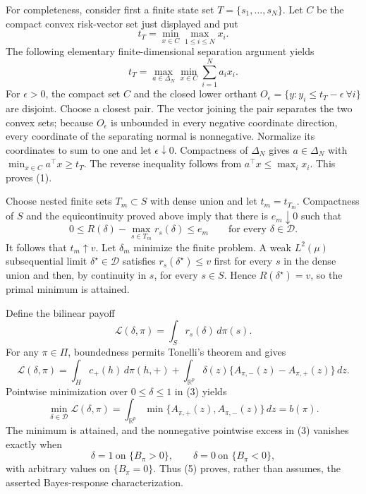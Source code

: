 For completeness, consider first a finite state set \(T=\{s_1,\ldots,s_N\}\). Let \(C\) be the compact convex risk-vector set just displayed and put
\[
 t_T=\min_{x\in C}\max_{1\leq i\leq N}x_i.
\]
The following elementary finite-dimensional separation argument yields
\[
 t_T=\max_{a\in\Delta_N}\min_{x\in C}\sum_{i=1}^Na_ix_i. \tag{1}
\]
For \(\epsilon>0\), the compact set \(C\) and the closed lower orthant \(O_{\epsilon}=\{y:y_i\leq t_T-\epsilon\ \forall i\}\) are disjoint. Choose a closest pair. The vector joining the pair separates the two convex sets; because \(O_{\epsilon}\) is unbounded in every negative coordinate direction, every coordinate of the separating normal is nonnegative. Normalize its coordinates to sum to one and let \(\epsilon\downarrow0\). Compactness of \(\Delta_N\) gives \(a\in\Delta_N\) with \(\min_{x\in C}a^{\top}x\geq t_T\). The reverse inequality follows from \(a^{\top}x\leq\max_i x_i\). This proves (1).

Choose nested finite sets \(T_m\subset S\) with dense union and let \(t_m=t_{T_m}\). Compactness of \(S\) and the equicontinuity proved above imply that there is \(e_m\downarrow0\) such that
\[
 0\leq R(\delta)-\max_{s\in T_m}r_s(\delta)\leq e_m
 \qquad\text{for every }\delta\in\mathcal D. \tag{2}
\]
It follows that \(t_m\uparrow v\). Let \(\delta_m\) minimize the finite problem. A weak \(L^2(\mu)\) subsequential limit \(\delta^{\star}\in\mathcal D\) satisfies \(r_s(\delta^{\star})\leq v\) first for every \(s\) in the dense union and then, by continuity in \(s\), for every \(s\in S\). Hence \(R(\delta^{\star})=v\), so the primal minimum is attained.

Define the bilinear payoff
\[
 \mathcal L(\delta,\pi)=\int_S r_s(\delta)\,d\pi(s).
\]
For any \(\pi\in\Pi\), boundedness permits Tonelli's theorem and gives
\[
 \mathcal L(\delta,\pi)
 =\int_Hc_{+}(h)\,d\pi(h,+)
   +\int_{\mathbb R^p}\delta(z)\{A_{\pi,-}(z)-A_{\pi,+}(z)\}\,dz. \tag{3}
\]
Pointwise minimization over \(0\leq\delta\leq1\) in (3) yields
\[
 \min_{\delta\in\mathcal D}\mathcal L(\delta,\pi)
 =\int_{\mathbb R^p}\min\{A_{\pi,+}(z),A_{\pi,-}(z)\}\,dz=b(\pi). \tag{4}
\]
The minimum is attained, and the nonnegative pointwise excess in (3) vanishes exactly when
\[
 \delta=1\ \text{on }\{B_{\pi}>0\},\qquad
 \delta=0\ \text{on }\{B_{\pi}<0\}, \tag{5}
\]
with arbitrary values on \(\{B_{\pi}=0\}\). Thus (5) proves, rather than assumes, the asserted Bayes-response characterization.

